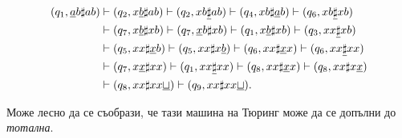 \begin{example}
  \begin{align*}
    (q_1, \underline{a}b\sharp ab) & \vdash (q_2, x\underline{b}\sharp ab) \vdash (q_2,xb\underline{\sharp}ab) \vdash (q_4, xb\sharp\underline{a}b) \vdash (q_6, xb\underline{\sharp}xb)\\
    & \vdash (q_7, x\underline{b}\sharp xb) \vdash (q_7, \underline{x}b\sharp xb) \vdash (q_1, x\underline{b}\sharp xb) \vdash (q_3, xx\underline{\sharp}xb)\\
    & \vdash (q_5, xx\sharp\underline{x}b) \vdash (q_5, xx\sharp x\underline{b}) \vdash (q_6, xx\sharp\underline{x}x) \vdash (q_6, xx\underline{\sharp} xx)\\
    & \vdash (q_7, x\underline{x}\sharp xx) \vdash (q_1, xx\underline{\sharp} xx) \vdash (q_8, xx\sharp\underline{x}x) \vdash (q_8, xx\sharp x\underline{x})\\
    & \vdash (q_8, xx\sharp xx\underline{\sqcup}) \vdash (q_9,xx\sharp xx\underline{\sqcup}).
  \end{align*}

  Може лесно да се съобрази, че тази машина на Тюринг може да се допълни до {\em тотална}.
  
\end{example}



